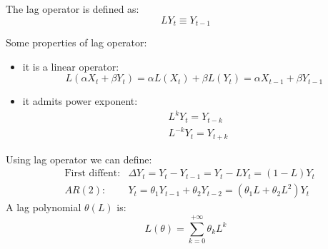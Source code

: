 \begin{mydefinition}
The lag operator is defined as:
\begin{equation}
	LY_t \equiv Y_{t-1}
\end{equation}
\end{mydefinition}
Some properties of lag operator:
\begin{itemize}
	\item it is a linear operator:
	\[
	L(\alpha X_t + \beta Y_t) = \alpha L(X_t) + \beta L(Y_t) = \alpha X_{t-1} + \beta Y_{t-1}
	\]
	\item it admits power exponent:
	\begin{align*}
		&L^k Y_t = Y_{t-k}\\
		& L^{-k} Y_t = Y_{t+k}
	\end{align*}
\end{itemize}
Using lag operator we can define:
\begin{align*}
	&\text{First diffent}:  & \Delta Y_t = Y_t - Y_{t-1} = Y_t - LY_t = (1-L)Y_t\\
	&AR(2): & Y_t = \theta_1 Y_{t-1} + \theta_2 Y_{t-2} = (\theta_1 L + \theta_2 L^2)Y_t
\end{align*}
A lag polynomial $\theta(L)$ is:
\[
L(\theta) = \sum_{k = 0}^{+\infty} \theta_kL^k
\]
